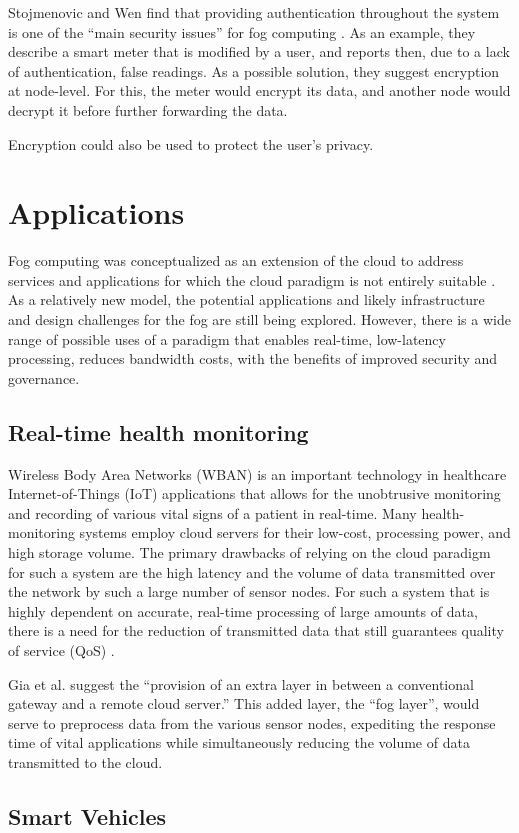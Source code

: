 \documentclass{article}
\begin{document}
Stojmenovic and Wen \cite{stojmenovic2014fog} find that providing authentication throughout the system is one of the ``main security issues'' for fog computing . As an example, they describe a smart meter that is modified by a user, and reports then, due to a lack of authentication, false readings. As a possible solution, they suggest encryption at node-level. For this, the meter would encrypt its data, and another node would decrypt it before further forwarding the data.

Encryption could also be used to protect the user's privacy.


\section{Applications}

Fog computing was conceptualized as an extension of the cloud to address services and applications for which the cloud paradigm is not entirely suitable \cite{bessis2014big}. As a relatively new model, the potential applications and likely infrastructure and design challenges for the fog are still being explored. However, there is a wide range of possible uses of a paradigm that enables real-time, low-latency processing, reduces bandwidth costs, with the benefits of improved security and governance.

\subsection{Real-time health monitoring}
Wireless Body Area Networks (WBAN) is an important technology in healthcare Internet-of-Things (IoT) applications that allows for the unobtrusive monitoring and recording of various vital signs of a patient in real-time. Many health-monitoring systems employ cloud servers for their low-cost, processing power, and high storage volume. The primary drawbacks of relying on the cloud paradigm for such a system are the high latency and the volume of data transmitted over the network by such a large number of sensor nodes. For such a system that is highly dependent on accurate, real-time processing of large amounts of data, there is a need for the reduction of transmitted data that still guarantees quality of service (QoS) \cite{gia2015fog}.

Gia et al. \cite{gia2015fog} suggest the “provision of an extra layer in between a conventional gateway and a remote cloud server.” This added layer, the “fog layer”, would serve to preprocess data from the various sensor nodes, expediting the response time of vital applications while simultaneously reducing the volume of data transmitted to the cloud.


\subsection{Smart Vehicles}


\renewcommand{\refname}{\section{References}}


\end{document}
